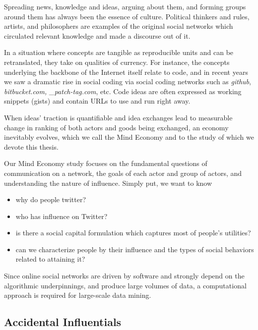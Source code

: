 \documentclass[10pt,oneside]{memoir}
\begin{document}
\begin{Spacing}{2}
Spreading news, knowledge and ideas, arguing about them, and forming groups around them has always been the essence of culture. Political thinkers and rules, artists, and philosophers are examples of the original social networks which circulated relevant knowledge and made a discourse out of it.


In a situation where concepts are tangible as reproducible units and can be retranslated, they take on qualities of currency.  For instance, the concepts underlying the backbone of the Internet itself relate to code, and in recent years we saw a dramatic rise in social coding via social coding networks such as {\itshape github}, {\itshape bitbucket.com, \_patch-tag.com}, etc.  Code ideas are often expressed as working snippets (gists) and contain URLs to use and run right away.


When ideas' traction is quantifiable and idea exchanges lead to measurable change in ranking of both actors and goods being exchanged, an economy inevitably evolves, which we call the Mind Economy and to the study of which we devote this thesis.


Our Mind Economy study focuses on the fundamental questions of communication on a network, the goals of each actor and group of actors, and understanding the nature of influence.  Simply put, we want to know


\begin{itemize}


\item why do people twitter?

\item who has influence on Twitter? 

\item is there a social capital formulation which captures most of people's utilities?

\item can we characterize people by their influence and the types of social behaviors related to attaining it?
\end{itemize}

Since online social networks are driven by software and strongly depend on the algorithmic underpinnings, and produce large volumes of data, a computational approach is required for large-scale data mining.


\pagebreak \subsection{Accidental Influentials}
\label{accidentalinfluentials}


\end{Spacing}
\end{document}
